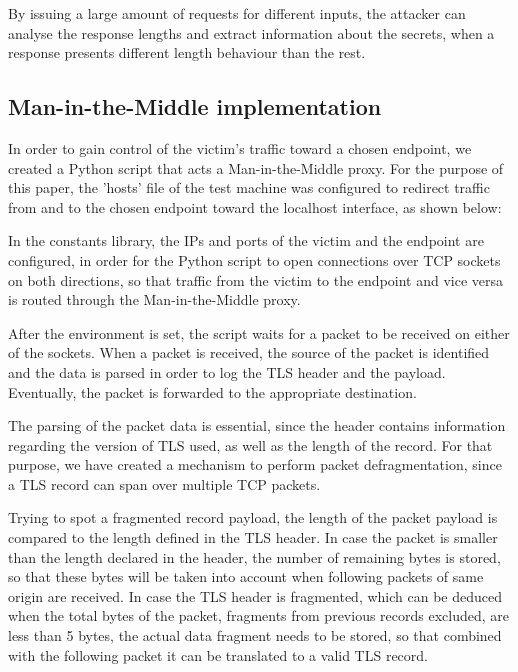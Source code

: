 By issuing a large amount of requests for different inputs, the attacker can
analyse the response lengths and extract information about the secrets, when a
response presents different length behaviour than the rest.

\subsection{Man-in-the-Middle implementation}

In order to gain control of the victim's traffic toward a chosen endpoint, we
created a Python script that acts a Man-in-the-Middle proxy. For the purpose of
this paper, the 'hosts' file of the test machine was configured to redirect
traffic from and to the chosen endpoint toward the localhost interface, as shown
below:


In the constants library, the IPs and ports of the victim and the endpoint are
configured, in order for the Python script to open connections over TCP sockets
on both directions, so that traffic from the victim to the endpoint and vice
versa is routed through the Man-in-the-Middle proxy.

After the environment is set, the script waits for a packet to be received on
either of the sockets.  When a packet is received, the source of the packet is
identified and the data is parsed in order to log the TLS header and the
payload. Eventually, the packet is forwarded to the appropriate destination.

The parsing of the packet data is essential, since the header contains
information regarding the version of TLS used, as well as the length of the
record. For that purpose, we have created a mechanism to perform packet
defragmentation, since a TLS record can span over multiple TCP packets.

Trying to spot a fragmented record payload, the length of the packet payload is
compared to the length defined in the TLS header. In case the packet is smaller
than the length declared in the header, the number of remaining bytes is stored,
so that these bytes will be taken into account when following packets of same
origin are received.  In case the TLS header is fragmented, which can be deduced
when the total bytes of the packet, fragments from previous records excluded,
are less than 5 bytes, the actual data fragment needs to be stored, so that
combined with the following packet it can be translated to a valid TLS record.

